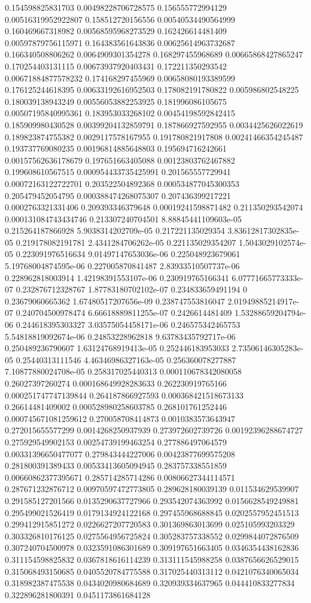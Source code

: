 \begin{table}
\begin{tabu}
\begin{sparkline}{10}
0.154598825831703 0.00498228706728575 0.156555772994129 0.00516319952922807 0.158512720156556 0.00540534490564999 0.160469667318982 0.00568595968273529 0.162426614481409 0.00597879756115971 0.164383561643836 0.00625614963732687 0.166340508806262 0.0064909301354278 0.168297455968689 0.00665868427865247 0.170254403131115 0.00673937920403431 0.172211350293542 0.00671884877578232 0.174168297455969 0.00658080193389599 0.176125244618395 0.00633192616952503 0.178082191780822 0.005986802548225 0.180039138943249 0.00556053882253925 0.181996086105675 0.00507195840995361 0.183953033268102 0.00454198592842415 0.185909980430528 0.00399204132859791 0.187866927592955 0.0034425626022619 0.189823874755382 0.0029117578167955 0.191780821917808 0.00241466354245487 0.193737769080235 0.00196814885648803 0.195694716242661 0.00157562636178679 0.197651663405088 0.00123803762467882 0.199608610567515 0.000954433735425991 0.201565557729941 0.00072163122722701 0.203522504892368 0.000534877045300353 0.205479452054795 0.000388474268075307 0.207436399217221 0.0002763321331406 0.209393346379648 0.00019241598871482 0.211350293542074 0.000131084743434746 0.213307240704501 8.88845441109603e-05 0.215264187866928 5.9038314202709e-05 0.217221135029354 3.83612817302835e-05 0.219178082191781 2.4341284706262e-05 0.221135029354207 1.5043029102574e-05 0.223091976516634 9.01497147653036e-06 0.225048923679061 5.19768004874595e-06 0.227005870841487 2.83933510507737e-06 0.228962818003914 1.42198391553107e-06 0.230919765166341 6.07771665773333e-07 0.232876712328767 1.87783180702102e-07 0.234833659491194 0 0.23679060665362 1.67480517207656e-09 0.238747553816047 2.01949885214917e-07 0.240704500978474 6.66618889811255e-07 0.2426614481409 1.53288659204794e-06 0.244618395303327 3.03575054458171e-06 0.246575342465753 5.54818819092674e-06 0.24853228962818 9.63783435792717e-06 0.250489236790607 1.63124768919413e-05 0.252446183953033 2.73506146305283e-05 0.25440313111546 4.46346986327163e-05 0.256360078277887 7.10877880024708e-05 0.258317025440313 0.000110678342080058 0.26027397260274 0.000168649928283633 0.262230919765166 0.000251747747139844 0.264187866927593 0.000368421518673133 0.26614481409002 0.000528980258603785 0.268101761252446 0.000745671081259612 0.270058708414873 0.0010383573643947 0.272015655577299 0.0014268250937939 0.273972602739726 0.00192396288674727 0.275929549902153 0.00254739199463254 0.277886497064579 0.00331396650477077 0.279843444227006 0.00423877699575208 0.281800391389433 0.00533413605094945 0.283757338551859 0.00660862377395671 0.285714285714286 0.00806627344114571 0.287671232876712 0.00970597472773805 0.289628180039139 0.011534629539907 0.291585127201566 0.0135290637727966 0.293542074363992 0.0156628549249881 0.295499021526419 0.0179134924122168 0.297455968688845 0.0202557952451513 0.299412915851272 0.0226627207720583 0.301369863013699 0.025105993203329 0.303326810176125 0.0275564956725824 0.305283757338552 0.0299844072876509 0.307240704500978 0.0323591086301689 0.309197651663405 0.0346354438162836 0.311154598825832 0.0367818616114239 0.313111545988258 0.0387656626529015 0.315068493150685 0.0405520784775588 0.317025440313112 0.0421076340065034 0.318982387475538 0.0434020980684689 0.320939334637965 0.044410833277834 0.322896281800391 0.0451173861684128 
\end{sparkline}
\end{tabu}
\end{table}
